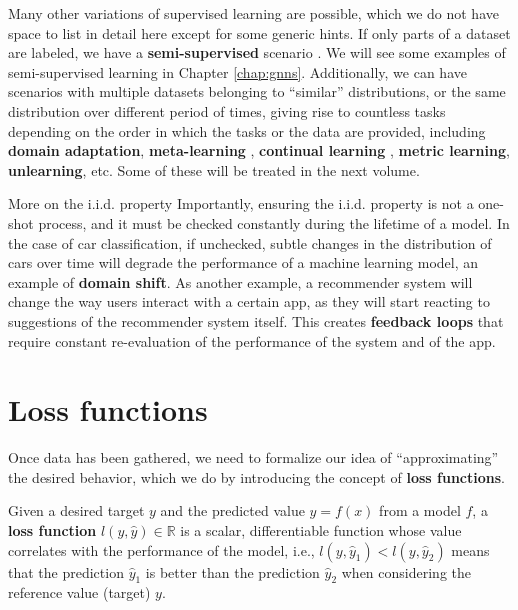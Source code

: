 Many other variations of supervised learning are possible, which we do not have space to list in detail here except for some generic hints. If only parts of a dataset are labeled, we have a \textbf{semi-supervised} scenario \cite{belkin2006manifold}. We will see some examples of semi-supervised learning in Chapter \ref{chap:gnns}. Additionally, we can have scenarios with multiple datasets belonging to “similar” distributions, or the same distribution over different period of times, giving rise to countless tasks depending on the order in which the tasks or the data are provided, including \textbf{domain adaptation}, \textbf{meta-learning} \cite{finn2017model}, \textbf{continual learning} \cite{parisi2019continual,biesialska2020continual}, \textbf{metric learning}, \textbf{unlearning}, etc. Some of these will be treated in the next volume.

\begin{supportbox}{More on the i.i.d. property}
Importantly, ensuring the i.i.d. property is not a one-shot process, and it must be checked constantly during the lifetime of a model. In the case of car classification, if unchecked, subtle changes in the distribution of cars over time will degrade the performance of a machine  learning model, an example of \textbf{domain shift}. As another example, a recommender system will change the way users interact with a certain app, as they will start reacting to suggestions of the recommender system itself. This creates \textbf{feedback loops} \cite{cinus2022effect} that require constant re-evaluation of the performance of the system and of the app.
\end{supportbox}

\section{Loss functions}
\label{sec:loss_functions}

\addclock Once data has been gathered, we need to formalize our idea of “approximating” the desired behavior, which we do by introducing the concept of \textbf{loss functions}.

\begin{definition} \addbottle
Given a desired target $y$ and the predicted value $\hat{y}=f(x)$ from a model $f$, a \textbf{loss function} $l(y, \hat{y}) \in \mathbb{R}$ is a scalar, differentiable function whose value correlates with the performance of the model, i.e., $l(y, \hat{y}_1) < l(y, \hat{y}_2)$ means that the prediction $\hat{y}_1$ is better than the prediction $\hat{y}_2$ when considering the reference value (target) $y$.
\end{definition}

